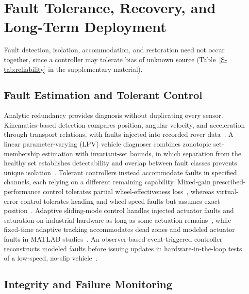 \section{Fault Tolerance, Recovery, and Long-Term Deployment}
\label{sec:reliability}

Fault detection, isolation, accommodation, and restoration need not occur together, since a controller may tolerate bias of unknown source (Table~\ref{S-tab:reliability} in the supplementary material).

\subsection{Fault Estimation and Tolerant Control}

Analytic redundancy provides diagnosis without duplicating every sensor. Kinematics-based detection compares position, angular velocity, and acceleration through transport relations, with faults injected into recorded rover data~\cite{P_E51}. A linear parameter-varying (LPV) vehicle diagnoser combines zonotopic set-membership estimation with invariant-set bounds, in which separation from the healthy set establishes detectability and overlap between fault classes prevents unique isolation~\cite{P_N16}. Tolerant controllers instead accommodate faults in specified channels, each relying on a different remaining capability. Mixed-gain prescribed-performance control tolerates partial wheel-effectiveness loss~\cite{P_M15}, whereas virtual-error control tolerates heading and wheel-speed faults but assumes exact position~\cite{P_M01}. Adaptive sliding-mode control handles injected actuator faults and saturation on industrial hardware as long as some actuation remains~\cite{P_E52}, while fixed-time adaptive tracking accommodates dead zones and modeled actuator faults in MATLAB studies~\cite{P_S15}. An observer-based event-triggered controller reconstructs modeled faults before issuing updates in hardware-in-the-loop tests of a low-speed, no-slip vehicle~\cite{P_F02}.

\subsection{Integrity and Failure Monitoring}

